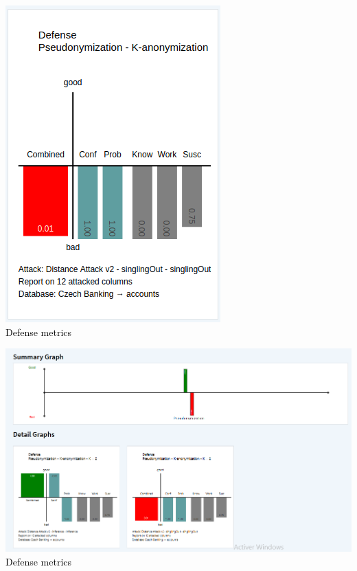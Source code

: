\documentclass{fancyslides}
\begin{document}

\begin{frame}
\begin{center}
\includegraphics[width=0.5\linewidth]{sem05.png} \\
\textcolor{black}{Defense metrics}
\end{center}
\end{frame}


\begin{frame}
\begin{center}
\includegraphics[width=1\linewidth]{sem01.png}
\textcolor{black}{Defense metrics}
\end{center}
\end{frame}
\end{document}
